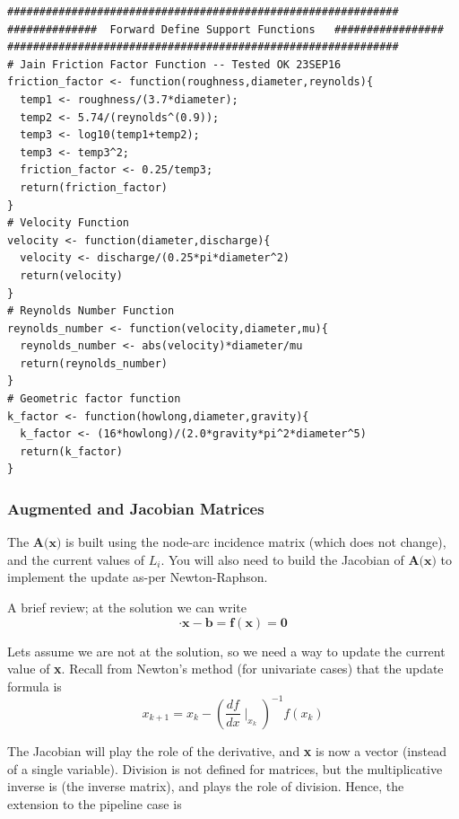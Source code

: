 \begin{lstlisting}[caption=R Code to compute Reynolds numbers and friction factors \\ , label=lst:HydraulicSupport]
#############################################################
##############  Forward Define Support Functions   #################
#############################################################
# Jain Friction Factor Function -- Tested OK 23SEP16
friction_factor <- function(roughness,diameter,reynolds){
  temp1 <- roughness/(3.7*diameter);
  temp2 <- 5.74/(reynolds^(0.9));
  temp3 <- log10(temp1+temp2);
  temp3 <- temp3^2;
  friction_factor <- 0.25/temp3;
  return(friction_factor)
}
# Velocity Function
velocity <- function(diameter,discharge){
  velocity <- discharge/(0.25*pi*diameter^2)
  return(velocity)
}
# Reynolds Number Function
reynolds_number <- function(velocity,diameter,mu){
  reynolds_number <- abs(velocity)*diameter/mu
  return(reynolds_number)
}
# Geometric factor function
k_factor <- function(howlong,diameter,gravity){
  k_factor <- (16*howlong)/(2.0*gravity*pi^2*diameter^5)
  return(k_factor)
}

\end{lstlisting}   


\subsubsection{Augmented and Jacobian Matrices}
The $\textbf{A(x)}$ is built using the node-arc incidence matrix (which does not change), and the current values of $L_i$.   
You will also need to build the Jacobian of $\textbf{A(x)}$ to implement the update as-per Newton-Raphson.

A brief review; at the solution we can write
\begin{equation}
[\mathbf{A}(\mathbf{x})] \cdot \mathbf{x} - \mathbf{b} = \mathbf{f}(\mathbf{x}) = \mathbf{0}
\end{equation}

Lets assume we are not at the solution, so we need a way to update the current value of \textbf{x}.
Recall from Newton's method (for univariate cases) that the update formula is
\begin{equation}
x_{k+1}=x_{k} - (\frac{df}{dx}\mid_{x_k})^{-1} f(x_k)
\end{equation}

The Jacobian will play the role of the derivative, and \textbf{x} is now a vector (instead of a single variable).
Division is not defined for matrices, but the multiplicative inverse is (the inverse matrix), and plays the role of division.
Hence, the extension to the pipeline case is

